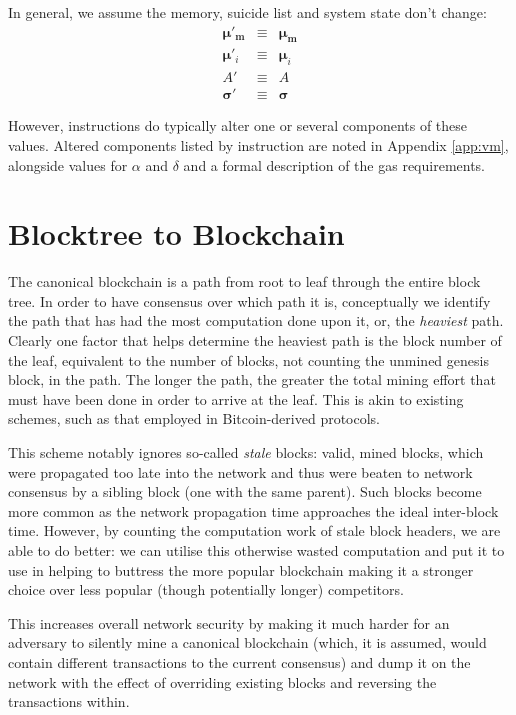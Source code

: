 \documentclass[9pt,oneside]{amsart}
\begin{document}
\begin{multicols}{2}
In general, we assume the memory, suicide list and system state don't change:
\begin{eqnarray}
\boldsymbol{\mu}'_\mathbf{m} & \equiv & \boldsymbol{\mu}_\mathbf{m} \\
\boldsymbol{\mu}'_i & \equiv & \boldsymbol{\mu}_i \\
A' & \equiv & A \\
\boldsymbol{\sigma}' & \equiv & \boldsymbol{\sigma}
\end{eqnarray}

However, instructions do typically alter one or several components of these values. Altered components listed by instruction are noted in Appendix \ref{app:vm}, alongside values for $\alpha$ and $\delta$ and a formal description of the gas requirements.

\section{Blocktree to Blockchain} \label{ch:ghost}

The canonical blockchain is a path from root to leaf through the entire block tree. In order to have consensus over which path it is, conceptually we identify the path that has had the most computation done upon it, or, the \textit{heaviest} path. Clearly one factor that helps determine the heaviest path is the block number of the leaf, equivalent to the number of blocks, not counting the unmined genesis block, in the path. The longer the path, the greater the total mining effort that must have been done in order to arrive at the leaf. This is akin to existing schemes, such as that employed in Bitcoin-derived protocols.

This scheme notably ignores so-called \textit{stale} blocks: valid, mined blocks, which were propagated too late into the network and thus were beaten to network consensus by a sibling block (one with the same parent). Such blocks become more common as the network propagation time approaches the ideal inter-block time. However, by counting the computation work of stale block headers, we are able to do better: we can utilise this otherwise wasted computation and put it to use in helping to buttress the more popular blockchain making it a stronger choice over less popular (though potentially longer) competitors.

This increases overall network security by making it much harder for an adversary to silently mine a canonical blockchain (which, it is assumed, would contain different transactions to the current consensus) and dump it on the network with the effect of overriding existing blocks and reversing the transactions within.


\end{multicols}
\end{document}
